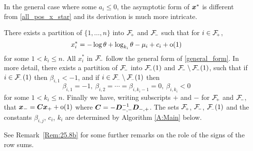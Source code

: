 In the general case where some $a_i\le 0$, the asymptotic form of $\bm{x}^*$ is
different from \eqref{all_pos_x_star} and its derivation is much more
intricate.

\begin{theorem}\label{Th:24.8a}
There exists a partition of $\{1,\ldots,n\}$ into $\Fset{+}$ and $\Fset{-}$
such that for $i \in \Fset{+}$,
%
\[
x_i^*=-\log\theta+\log_{k_i}\theta- \mu_i + c_i +{\mathrm{o}}(1)
\]
%
for some $1<k_i\le n$. All $x_i^*$ in $\Fset{-}$ follow the general form of
\eqref{general_form}.  In more detail, there exists a partition of $\Fset{-}$
into $\Fset{-}(1)$ and $\Fset{-} \setminus \Fset{-}(1)$, such that if $i\in
\Fset{-}(1)$ then $\beta_{i,1} < -1$, and if $i \in \Fset{-} \setminus
\Fset{-}(1)$ then
%
\[ \beta_{i,1} = -1,\ \beta_{i,2} = \cdots = \beta_{i,k_i-1} = 0,\ \beta_{i,k_i}
< 0 \]
%
for some $1<k_i\le n$.  Finally we have, writing subscripts $+$ and $-$ for
$\Fset{+}$ and $\Fset{-}$, that $\bm{x}_{-} = \bm{C} \bm{x}_{+} + {\mathrm{o}}(1)$ where
$\bm{C} = -\bm{D}_{{-},{-}}^{-1}\bm{D}_{{-},{+}}$. The sets $\Fset{+}$, $\Fset{-}$,
$\Fset{-}(1)$ and the constants $\beta_{i,j}$, $c_i$, $k_i$ are determined by
Algorithm \ref{A:Main} below.
\end{theorem}

See Remark~\ref{Rem:25.8b} for some further remarks on the role of the signs
of the row sums.

